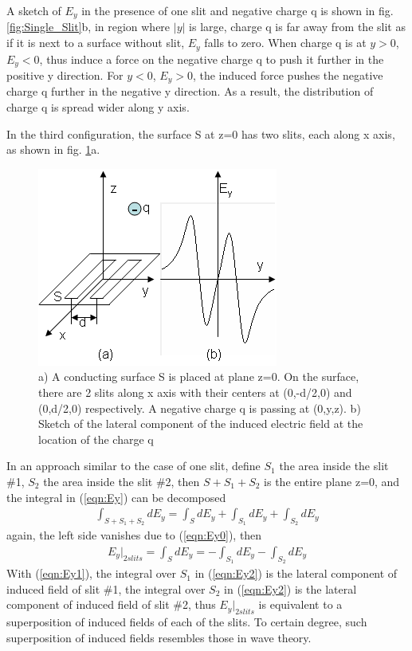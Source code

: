 \documentclass[prd,showpacs,twocolumn]{revtex4-1}
\begin{document}
A sketch of $E_y$ in the presence of one slit and negative charge q is shown in fig. \ref{fig:Single_Slit}b, in region where $|y|$ is large, charge q is far away from the slit as if it is next to a surface without slit, $E_y$ falls to zero. When charge q is at $y>0$, $E_y<0$, thus induce a force on the negative charge q to push it further in the positive y direction. For $y<0$, $E_y>0$, the induced force pushes the negative charge q further in the negative y direction. As a result, the distribution of charge q is spread wider along y axis.

In the third configuration, the surface S at z=0 has two slits, each along x axis, as shown in fig. \ref{fig:Double_Slit}a.
\begin{figure}
\center
\includegraphics{2slits.png}
\caption{a) A conducting surface S is placed at plane z=0. On the surface, there are 2 slits along x axis with their centers at (0,-d/2,0) and (0,d/2,0) respectively. A negative charge q is passing at (0,y,z). b) Sketch of the lateral component of the induced electric field at the location of the charge q}
\label{fig:Double_Slit}
\end{figure}
In an approach similar to the case of one slit, define $S_1$ the area inside the slit \#1, $S_2$ the area inside the slit \#2, then $S+S_1+S_2$ is the entire plane z=0, and the integral in (\ref{eqn:Ey}) can be decomposed
\begin{eqnarray}
\int_{S+S_1+S_2} dE_y=\int_{S} dE_y+\int_{S_1} dE_y+\int_{S_2} dE_y
\label{eqn:Ey0_2}
\end{eqnarray}
again, the left side vanishes due to (\ref{eqn:Ey0}), then
\begin{eqnarray}
E_y|_{2slits}=\int_{S} dE_y=-\int_{S_1} dE_y-\int_{S_2} dE_y
\label{eqn:Ey2}
\end{eqnarray}
With (\ref{eqn:Ey1}), the integral over $S_1$ in (\ref{eqn:Ey2}) is the lateral component of induced field of slit \#1, the integral over $S_2$ in (\ref{eqn:Ey2}) is the lateral component of induced field of slit \#2, thus $E_y|_{2slits}$ is equivalent to a superposition of induced fields of each of the slits. To certain degree, such superposition of induced fields resembles those in wave theory.
\end{document}

